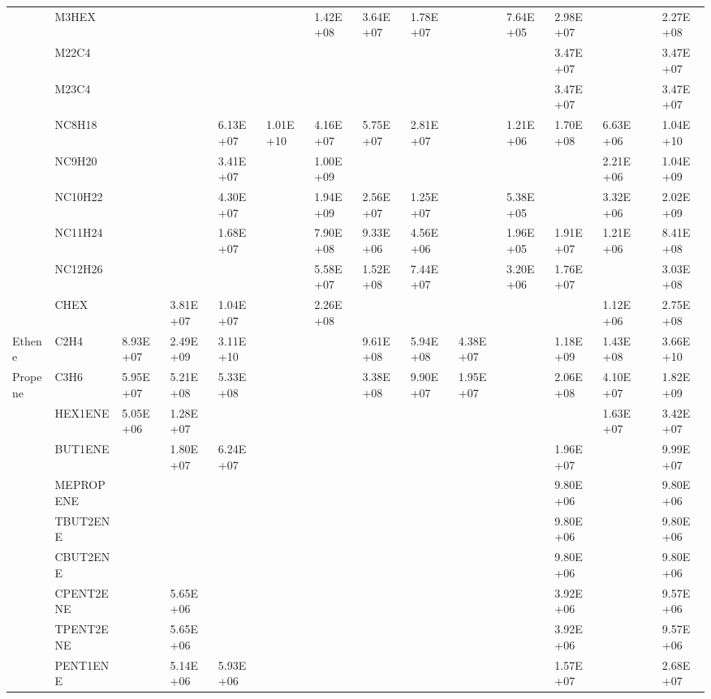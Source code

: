 \begin{longtable}{lllllllllllllll}
	 & M3HEX &  &  &  &  & 1.42E+08 & 3.64E+07 & 1.78E+07 &  & 7.64E+05 & 2.98E+07 &  &  & 2.27E+08 \\
	 & M22C4 &  &  &  &  &  &  &  &  &  & 3.47E+07 &  &  & 3.47E+07 \\
	 & M23C4 &  &  &  &  &  &  &  &  &  & 3.47E+07 &  &  & 3.47E+07 \\
	 & NC8H18 &  &  & 6.13E+07 & 1.01E+10 & 4.16E+07 & 5.75E+07 & 2.81E+07 &  & 1.21E+06 & 1.70E+08 & 6.63E+06 &  & 1.04E+10 \\
	 & NC9H20 &  &  & 3.41E+07 &  & 1.00E+09 &  &  &  &  &  & 2.21E+06 &  & 1.04E+09 \\
	 & NC10H22 &  &  & 4.30E+07 &  & 1.94E+09 & 2.56E+07 & 1.25E+07 &  & 5.38E+05 &  & 3.32E+06 &  & 2.02E+09 \\
	 & NC11H24 &  &  & 1.68E+07 &  & 7.90E+08 & 9.33E+06 & 4.56E+06 &  & 1.96E+05 & 1.91E+07 & 1.21E+06 &  & 8.41E+08 \\
	 & NC12H26 &  &  &  &  & 5.58E+07 & 1.52E+08 & 7.44E+07 &  & 3.20E+06 & 1.76E+07 &  &  & 3.03E+08 \\
	 & CHEX &  & 3.81E+07 & 1.04E+07 &  & 2.26E+08 &  &  &  &  &  & 1.12E+06 &  & 2.75E+08 \\
	\hline Ethene & C2H4 & 8.93E+07 & 2.49E+09 & 3.11E+10 &  &  & 9.61E+08 & 5.94E+08 & 4.38E+07 &  & 1.18E+09 & 1.43E+08 &  & 3.66E+10 \\ \hline
	Propene & C3H6 & 5.95E+07 & 5.21E+08 & 5.33E+08 &  &  & 3.38E+08 & 9.90E+07 & 1.95E+07 &  & 2.06E+08 & 4.10E+07 &  & 1.82E+09 \\
	\hline \parbox[t]{2mm}{} & HEX1ENE & 5.05E+06 & 1.28E+07 &  &  &  &  &  &  &  &  & 1.63E+07 &  & 3.42E+07 \\
	 & BUT1ENE &  & 1.80E+07 & 6.24E+07 &  &  &  &  &  &  & 1.96E+07 &  &  & 9.99E+07 \\
	 & MEPROPENE &  &  &  &  &  &  &  &  &  & 9.80E+06 &  &  & 9.80E+06 \\
	 & TBUT2ENE &  &  &  &  &  &  &  &  &  & 9.80E+06 &  &  & 9.80E+06 \\
	 & CBUT2ENE &  &  &  &  &  &  &  &  &  & 9.80E+06 &  &  & 9.80E+06 \\
	 & CPENT2ENE &  & 5.65E+06 &  &  &  &  &  &  &  & 3.92E+06 &  &  & 9.57E+06 \\
	 & TPENT2ENE &  & 5.65E+06 &  &  &  &  &  &  &  & 3.92E+06 &  &  & 9.57E+06 \\
	 & PENT1ENE &  & 5.14E+06 & 5.93E+06 &  &  &  &  &  &  & 1.57E+07 &  &  & 2.68E+07 \\

\end{longtable}
